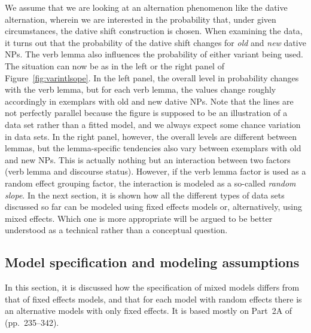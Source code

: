 \documentclass[a4paper,12pt]{article}
\begin{document}
We assume that we are looking at an alternation phenomenon like the dative alternation, wherein we are interested in the probability that, under given circumstances, the dative shift construction is chosen.
When examining the data, it turns out that the probability of the dative shift changes for \textit{old} and \textit{new} dative NPs.
The verb lemma also influences the probability of either variant being used.
The situation can now be as in the left or the right panel of Figure~\ref{fig:varintlsope}.
In the left panel, the overall level in probability changes with the verb lemma, but for each verb lemma, the values change roughly accordingly in exemplars with old and new dative NPs.
Note that the lines are not perfectly parallel because the figure is supposed to be an illustration of a data set rather than a fitted model, and we always expect some chance variation in data sets.
In the right panel, however, the overall levels are different between lemmas, but the lemma-specific tendencies also vary between exemplars with old and new NPs.
This is actually nothing but an interaction between two factors (verb lemma and discourse status).
However, if the verb lemma factor is used as a random effect grouping factor, the interaction is modeled as a so-called \textit{random slope}.
In the next section, it is shown how all the different types of data sets discussed so far can be modeled using fixed effects models or, alternatively, using mixed effects.
Which one is more appropriate will be argued to be better understood as a technical rather than a conceptual question.

\subsection{Model specification and modeling assumptions}
\label{sec:modelspecificationandmodelingassumptions}

In this section, it is discussed how the specification of mixed models differs from that of fixed effects models, and that for each model with random effects there is an alternative models with only fixed effects.
It is based mostly on Part~2A of \citet{GelmanHill2006} (pp.~235--342).
\end{document}
